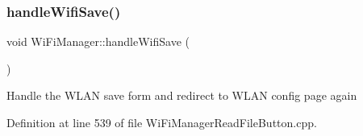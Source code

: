 \mbox{\label{class_wi_fi_manager_a2a8c2b60aa86dfdeab8a1a90f7122dc7}} 
\subsubsection{\texorpdfstring{handle\+Wifi\+Save()}{handleWifiSave()}}
{\footnotesize\ttfamily void Wi\+Fi\+Manager\+::handle\+Wifi\+Save (\begin{DoxyParamCaption}{ }\end{DoxyParamCaption})\hspace{0.3cm}{\ttfamily [private]}}

Handle the W\+L\+AN save form and redirect to W\+L\+AN config page again 

Definition at line 539 of file Wi\+Fi\+Manager\+Read\+File\+Button.\+cpp.


